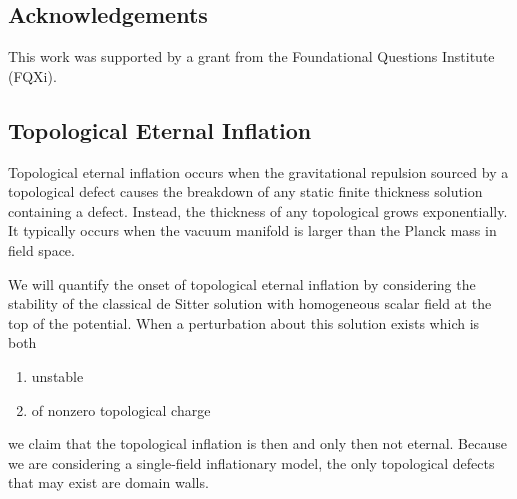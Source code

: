 \documentclass[aps,amsfonts,amsmath,prd,preprint,nofootinbib]{revtex4}
\begin{document}
\subsection*{Acknowledgements}
This work was supported by a grant from the Foundational Questions Institute (FQXi).




\begin{appendix}










\section{Topological Eternal Inflation}\label{sec:topo}
Topological eternal inflation \cite{Vilenkin:1994pv,Linde:1994wt} occurs when the gravitational repulsion sourced by a topological defect causes the breakdown of any static finite thickness solution containing a defect.  Instead, 
the thickness of any topological grows exponentially.  It typically \cite{Sakai:2003st}
occurs when the vacuum manifold is larger than the Planck mass in field space.  

We will quantify the onset of topological eternal inflation by considering the stability of the classical de Sitter solution with homogeneous scalar field at the top of the potential.  When a perturbation about this
solution exists which is both
\begin{enumerate}
\item unstable
\item of nonzero topological charge
 \end{enumerate}
 we claim that the topological inflation is then and only then not eternal.
Because we are considering a single-field inflationary model, the only topological defects that may exist are domain walls.  %






\end{appendix}
\end{document}
